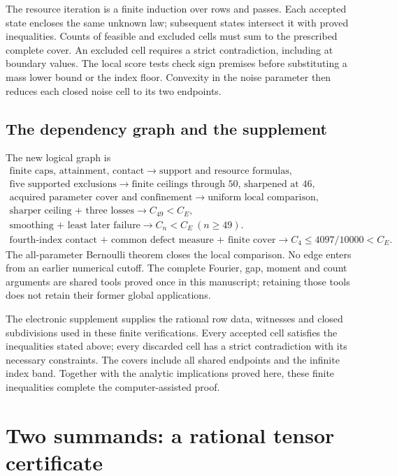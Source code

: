 \documentclass[11pt,a4paper]{article}
\numberwithin{equation}{section}
\theoremstyle{definition}
\theoremstyle{remark}
\begin{document}
The resource iteration is a finite induction over rows and passes.
Each accepted state encloses the same unknown law; subsequent states
intersect it with proved inequalities. Counts of feasible and excluded
cells must sum to the prescribed complete cover. An excluded cell
requires a strict contradiction, including at boundary values. The
local score tests check sign premises before substituting a mass lower
bound or the index floor. Convexity in the noise parameter then reduces
each closed noise cell to its two endpoints.

\subsection{The dependency graph and the supplement}
The new logical graph is
\[
\begin{gathered}
 \text{finite caps, attainment, contact}
 \longrightarrow \text{support and resource formulas},\\
 \text{five supported exclusions}
 \longrightarrow \text{finite ceilings through }50\text{, sharpened at }46,\\
 \text{acquired parameter cover and confinement}
 \longrightarrow \text{uniform local comparison},\\
 \text{sharper ceiling + three losses}\longrightarrow C_{49}<C_E,\\
 \text{smoothing + least later failure}\longrightarrow C_n<C_E\ (n\ge49).
 \\
 \text{fourth-index contact + common defect measure + finite cover}
 \longrightarrow C_4\le4097/10000<C_E.
\end{gathered}
\]
The all-parameter Bernoulli theorem closes the local comparison.
No edge enters from an earlier numerical cutoff. The complete Fourier,
gap, moment and count arguments are shared tools proved once in this
manuscript; retaining those tools does not retain their former global
applications.

The electronic supplement supplies the rational row data, witnesses and
closed subdivisions used in these finite verifications. Every accepted
cell satisfies the inequalities stated above; every discarded cell has a
strict contradiction with its necessary constraints. The covers include
all shared endpoints and the infinite index band. Together with the
analytic implications proved here, these finite inequalities complete
the computer-assisted proof.

\section{Two summands: a rational tensor certificate}\label{n2:section}
\end{document}
